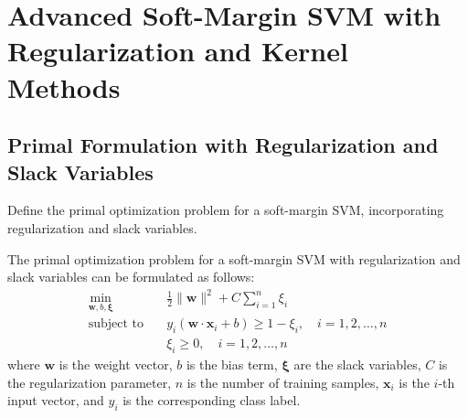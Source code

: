 \section{Advanced Soft-Margin SVM with Regularization and Kernel Methods}

\subsection{Primal Formulation with Regularization and Slack Variables}
Define the primal optimization problem for a soft-margin SVM, incorporating regularization and slack variables.
\begin{qsolve}
    \begin{qsolve}[]
        The primal optimization problem for a soft-margin SVM with regularization and slack variables can be formulated as follows:
        \begin{align*}
            \min_{\mathbf{w}, b, \boldsymbol{\xi}} & \quad \frac{1}{2} \|\mathbf{w}\|^2 + C \sum_{i=1}^{n} \xi_i \\
            \text{subject to} & \quad y_i(\mathbf{w} \cdot \mathbf{x}_i + b) \geq 1 - \xi_i, \quad i = 1, 2, \ldots, n \\
            & \quad \xi_i \geq 0, \quad i = 1, 2, \ldots, n
        \end{align*}
        where $\mathbf{w}$ is the weight vector, $b$ is the bias term, $\boldsymbol{\xi}$ are the slack variables, $C$ is the regularization parameter, $n$ is the number of training samples, $\mathbf{x}_i$ is the $i$-th input vector, and $y_i$ is the corresponding class label.
    \end{qsolve}
\end{qsolve}
